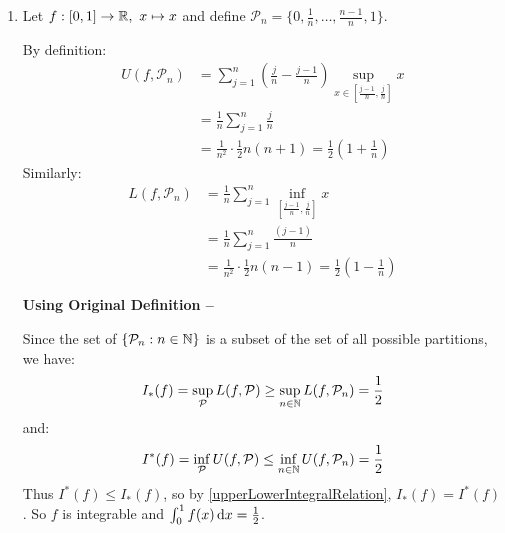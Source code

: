 \documentclass[../main.tex]{subfiles}
\begin{document}
\begin{example}
  \begin{enumerate}
    \item Let $f: [0, 1] \to \mathbb{R},\ x \mapsto x$ and define $\mathcal{P}_n = \{0, \frac{1}{n}, \ldots, \frac{n - 1}{n}, 1\}$.

      By definition:
      \begin{align*}
        U(f, \mathcal{P}_n) &= \sum_{j = 1}^{n} \left(\frac{j}{n} - \frac{j - 1}{n}\right) \sup_{x \in [\frac{j - 1}{n}, \frac{j}{n}]} x \\
                            &= \frac{1}{n} \sum_{j = 1}^{n} \frac{j}{n} \\
                            &= \frac{1}{n^2} \cdot \frac{1}{2}n(n + 1) = \frac{1}{2}\left(1 + \frac{1}{n}\right)
      \end{align*}
      Similarly:
      \begin{align*}
        L(f, \mathcal{P}_n) &= \frac{1}{n} \sum_{j = 1}^{n} \inf_{[\frac{j - 1}{n}, \frac{j}{n}]} x \\
                            &= \frac{1}{n} \sum_{j = 1}^{n} \frac{(j - 1)}{n} \\
                            &= \frac{1}{n^2} \cdot \frac{1}{2}n(n - 1) = \frac{1}{2}\left(1 - \frac{1}{n}\right)
      \end{align*}

      \textbf{Using Original Definition -- }\par
      Since the set of $\{\mathcal{P}_n: n \in \mathbb{N}\}$ is a subset of the set of all possible partitions, we have:
      \[
        I_{*}(f) = \sup_{\mathcal{P}} L(f, \mathcal{P}) \geq \sup_{n \in \mathbb{N}} L(f, \mathcal{P}_n) = \frac{1}{2}
      \]
      and:
      \[
        I^{*}(f) = \inf_{\mathcal{P}} U(f, \mathcal{P}) \leq \inf_{n \in \mathbb{N}} U(f, \mathcal{P}_n) = \frac{1}{2}
      \]
      Thus $I^{*}(f) \leq I_{*}(f)$, so by \cref{upperLowerIntegralRelation}, $I_{*}(f) = I^{*}(f)$.
      So $f$ is integrable and $\int_{0}^{1} f(x) \d{x} = \frac{1}{2}$.


\end{enumerate}
\end{example}
\end{document}
